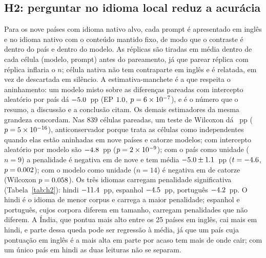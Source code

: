 \begin{table}[h]
\centering
\caption{Acurácia composta por tipo de tarefa (25 países; T1 em 24, sem chave
para o Egito). Em T1, T2 e T3 o subcomponente de acurácia factual é o veredito
de código onde o valor devolvido é conferível contra o registro oficial, e os
demais subcomponentes são pontuados por juiz; T4 é pontuada pelo painel; T5
mantém as pontuações do juiz da coleta.}
\label{tab:conf-tarefa}
\footnotesize
\setlength{\tabcolsep}{8pt}
\renewcommand{\arraystretch}{1.15}

\end{table}

\subsection{H2: perguntar no idioma local reduz a acurácia}
\label{sec:res:h2}

Para os nove países com idioma nativo alvo, cada prompt é apresentado em inglês
e no idioma nativo com o conteúdo mantido fixo, de modo que o contraste é dentro
do país e dentro do modelo. As réplicas são tiradas em média dentro de cada
célula (modelo, prompt) antes do pareamento, já que parear réplica com réplica
inflaria o $n$; \nhtwosempar{} célula nativa não tem contraparte em inglês e é
relatada, em vez de descartada em silêncio. A estimativa-manchete é a que respeita o aninhamento: um
modelo misto sobre as diferenças pareadas com intercepto aleatório por país dá
$-5.0$~pp (EP $1.0$,
$p=6\times10^{-7}$), e é o número que o resumo, a discussão e a conclusão
citam. Os demais estimadores da mesma grandeza concordam. Nas 839 células
pareadas, um teste de Wilcoxon dá \nnativa{}~pp ($p=5\times10^{-16}$),
anticonservador porque trata as células como independentes quando elas estão
aninhadas em nove países e catorze modelos; com intercepto aleatório por modelo
são $-4.8$~pp ($p=2\times10^{-9}$); com o país como unidade
($n=9$) a penalidade é negativa em \nhtwocneg{} de nove e tem média
$-5.0\pm1.1$~pp ($t=-4.6$, $p=0.002$); com o modelo como
unidade ($n=14$) é negativa em \nhtwomneg{} de catorze (Wilcoxon
$p=0.058$). Os três idiomas carregam penalidade significativa
(Tabela~\ref{tab:h2}): hindi $-11.4$~pp, espanhol $-4.5$~pp,
português $-4.2$~pp. O hindi é o idioma de menor corpus e carrega a maior
penalidade; espanhol e português, cujos corpora diferem em tamanho, carregam
penalidades que não diferem. A Índia, que pontua mais alto entre os 25 países
em inglês, cai mais em hindi, e parte dessa queda pode ser regressão à média,
já que um país cuja pontuação em inglês é a mais alta em parte por acaso tem
mais de onde cair; com um único país em hindi as duas leituras não se separam.

